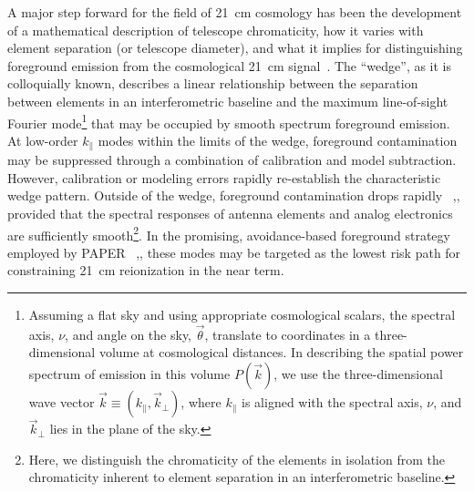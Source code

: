 \documentclass[twocolumn]{emulateapj}
\begin{document}
    A major step forward for the field of 21~cm cosmology has been the development
    of a mathematical description of telescope chromaticity, how it varies with
    element separation (or telescope diameter), and what it implies for distinguishing
    foreground emission from the cosmological 21~cm signal~\citep{Thyagarajan_et_al2015}.  The ``wedge'', as it is
    colloquially known, describes a linear relationship between the separation between elements
    in an interferometric baseline and the maximum line-of-sight Fourier mode\footnote{Assuming
    a flat sky and using appropriate
    cosmological scalars,
    the spectral axis, $\nu$, and angle on the sky, $\vec\theta$, translate to coordinates in
    a three-dimensional volume at cosmological distances.  In describing the spatial power spectrum of
    emission in this volume $P(\vec k)$, we use the three-dimensional wave vector 
    $\vec k\equiv(k_\parallel,\vec k_\perp)$, where $k_\parallel$ is aligned with the
    spectral axis, $\nu$, and $\vec k_\perp$ lies in the plane of the sky.}
    that may be occupied by smooth spectrum foreground emission.  At low-order $k_\parallel$ modes
    within the limits of the wedge,
    foreground contamination may be suppressed through a combination of calibration and model 
    subtraction.  However, calibration or modeling errors rapidly re-establish the characteristic
    wedge pattern.  Outside of the wedge, foreground contamination drops rapidly 
    ~\citep{pober_et_al2013},\citep{Thyagarajan_et_al2015}, provided that the spectral responses
    of antenna elements and analog electronics are sufficiently smooth\footnote{Here, we distinguish
    the chromaticity of the elements in isolation from the chromaticity inherent to
    element separation in an interferometric baseline.}.  In the promising, avoidance-based
    foreground strategy employed by PAPER ~\citep{parsons_et_al2014},\citep{Ali_et_al2015}, these modes
    may be targeted as the lowest risk path for constraining 21~cm reionization in the near term.
      
\end{document}
